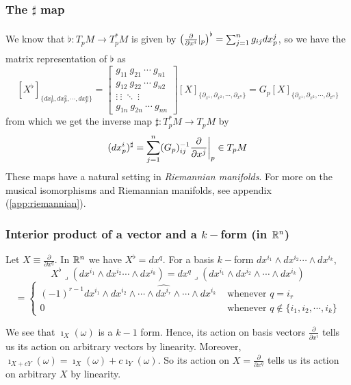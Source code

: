\subsubsection{\label{section:sharp_map}The $\sharp$ map}
We know that $\flat: T_pM\to T_p^*M$ is given by $\big{(}\frac{\partial}{\partial x^i}\bigg.{|}_p\big{)}^{\flat}= \sum_{j=1}^n g_{ij}dx_p^j$, so we have the matrix representation of $\flat$ as $$[X^{\flat}]_{\{dx_p^1,dx_p^2,\cdots,dx^n_p\}}= \begin{bmatrix}
    g_{11} \ g_{21} \ \cdots \ g_{n1} \\
    g_{12} \ g_{22} \ \cdots \ g_{n2} \\
    \vdots \ \vdots \ \ddots \ \vdots \\
    g_{1n} \ g_{2n} \ \cdots \ g_{nn}
\end{bmatrix} [X]_{\{\partial_{x^1},\partial_{x^2},\cdots, \partial_{x^n}\}}=G_p [X]_{\{\partial_{x^1},\partial_{x^2},\cdots, \partial_{x^n}\}} $$
from which we get the inverse map $\sharp:T_p^*M\to T_pM$ by $$(dx_p^i)^{\sharp}=\sum_{j=1}^n (G_p)^{-1}_{ij}\frac{\partial}{\partial x^j}\bigg{|}_p \in T_pM $$
These maps have a natural setting in \emph{Riemannian manifolds}. For more on the musical isomorphisms and Riemannian manifolds, see appendix (\ref{app:riemannian}).
\subsubsection{Interior product of a vector and a $k-$form (in $\mathbb{R}^n$)}
Let $X\equiv \frac{\partial}{\partial x^q}$. In $\mathbb{R}^n$ we have $X^{\flat}=dx^q$. For a basis $k-$form $dx^{i_1}\wedge dx^{i_2}\cdots \wedge dx^{i_k}$, $$X^{\flat} \lrcorner (dx^{i_1}\wedge dx^{i_2}\cdots \wedge dx^{i_k})=dx^q \lrcorner (dx^{i_1}\wedge dx^{i_2}\wedge \cdots \wedge dx^{i_k}) $$ \begin{equation} \label{interior product as wedge}= \begin{cases}
    (-1)^{r-1} dx^{i_1}\wedge dx^{i_2} \wedge \cdots \wedge \widehat{dx^{i_r}}\wedge \cdots \wedge dx^{i_k} & \text{ whenever }q=i_r \\ 
    0 & \text{ whenever }q\not\in \{i_1,i_2,\cdots,i_k\}
\end{cases} \end{equation}

\begin{remark}\label{remark:interior_is_a_form}
We see that $\imath_X(\omega)$ is a $k-1$ form. Hence, its action on basis vectors $\frac{\partial}{\partial x^i}$ tells us its action on arbitrary vectors by linearity. Moreover, $\imath_{X+cY}(\omega)=\imath_X(\omega)+c\imath_Y(\omega)$. So its action on $X=\frac{\partial}{\partial x^q}$ tells us its action on arbitrary $X$ by linearity.
\end{remark}


